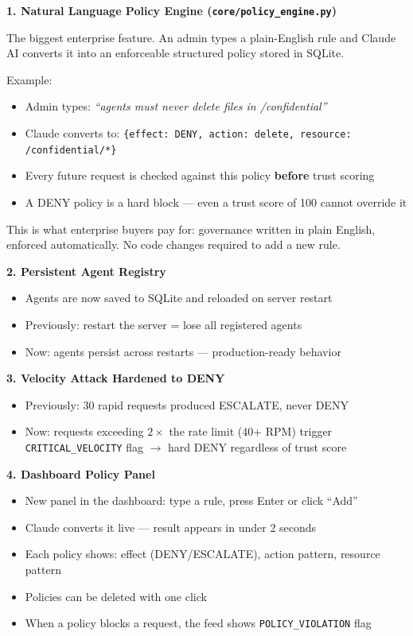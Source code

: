 \documentclass[12pt, a4paper]{article}
\begin{document}
\textbf{1. Natural Language Policy Engine (\texttt{core/policy\_engine.py})}

The biggest enterprise feature. An admin types a plain-English rule and Claude AI
converts it into an enforceable structured policy stored in SQLite.

Example:
\begin{itemize}[noitemsep]
  \item Admin types: \textit{``agents must never delete files in /confidential''}
  \item Claude converts to: \texttt{\{effect: DENY, action: delete, resource: /confidential/*\}}
  \item Every future request is checked against this policy \textbf{before} trust scoring
  \item A DENY policy is a hard block — even a trust score of 100 cannot override it
\end{itemize}

This is what enterprise buyers pay for: governance written in plain English,
enforced automatically. No code changes required to add a new rule.

\textbf{2. Persistent Agent Registry}
\begin{itemize}[noitemsep]
  \item Agents are now saved to SQLite and reloaded on server restart
  \item Previously: restart the server = lose all registered agents
  \item Now: agents persist across restarts — production-ready behavior
\end{itemize}

\textbf{3. Velocity Attack Hardened to DENY}
\begin{itemize}[noitemsep]
  \item Previously: 30 rapid requests produced ESCALATE, never DENY
  \item Now: requests exceeding $2\times$ the rate limit (40+ RPM) trigger \texttt{CRITICAL\_VELOCITY} flag $\rightarrow$ hard DENY regardless of trust score
\end{itemize}

\textbf{4. Dashboard Policy Panel}
\begin{itemize}[noitemsep]
  \item New panel in the dashboard: type a rule, press Enter or click ``Add''
  \item Claude converts it live — result appears in under 2 seconds
  \item Each policy shows: effect (DENY/ESCALATE), action pattern, resource pattern
  \item Policies can be deleted with one click
  \item When a policy blocks a request, the feed shows \texttt{POLICY\_VIOLATION} flag
\end{itemize}
\end{document}
